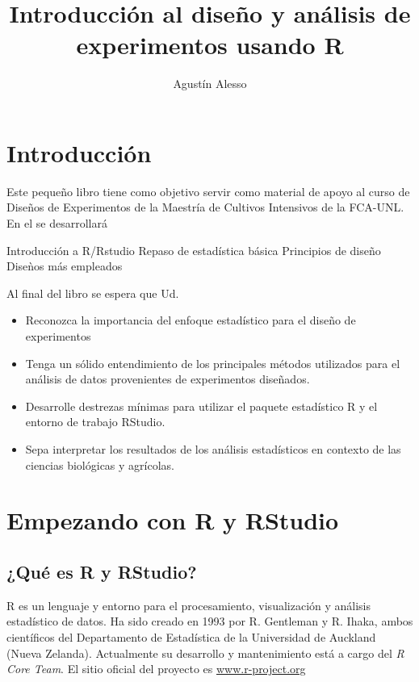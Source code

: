 \documentclass[a4paper]{book}
\title{Introducción al diseño y análisis de experimentos usando R}
\author{Agustín Alesso}
\date{}
\providecommand{\tightlist}{%
  \setlength{\itemsep}{0pt}\setlength{\parskip}{0pt}}
\begin{document}
\maketitle

{
\setcounter{tocdepth}{1}
\tableofcontents
}
\hypertarget{introduccion}{%
\chapter*{Introducción}\label{introduccion}}

Este pequeño libro tiene como objetivo servir como material de apoyo al
curso de Diseños de Experimentos de la Maestría de Cultivos Intensivos
de la FCA-UNL. En el se desarrollará

Introducción a R/Rstudio Repaso de estadística básica Principios de
diseño Diseǹos más empleados

Al final del libro se espera que Ud.

\begin{itemize}
\tightlist
\item
  Reconozca la importancia del enfoque estadístico para el diseño de
  experimentos
\item
  Tenga un sólido entendimiento de los principales métodos utilizados
  para el análisis de datos provenientes de experimentos diseñados.
\item
  Desarrolle destrezas mínimas para utilizar el paquete estadístico R y
  el entorno de trabajo RStudio.
\item
  Sepa interpretar los resultados de los análisis estadísticos en
  contexto de las ciencias biológicas y agrícolas.
\end{itemize}

\hypertarget{empezando-con-r-y-rstudio}{%
\chapter{Empezando con R y RStudio}\label{empezando-con-r-y-rstudio}}

\hypertarget{que-es-r-y-rstudio}{%
\section{¿Qué es R y RStudio?}\label{que-es-r-y-rstudio}}

R es un lenguaje y entorno para el procesamiento, visualización y
análisis estadístico de datos. Ha sido creado en 1993 por R. Gentleman y
R. Ihaka, ambos científicos del Departamento de Estadística de la
Universidad de Auckland (Nueva Zelanda). Actualmente su desarrollo y
mantenimiento está a cargo del \emph{R Core Team}. El sitio oficial del
proyecto es \url{www.r-project.org}
\end{document}
